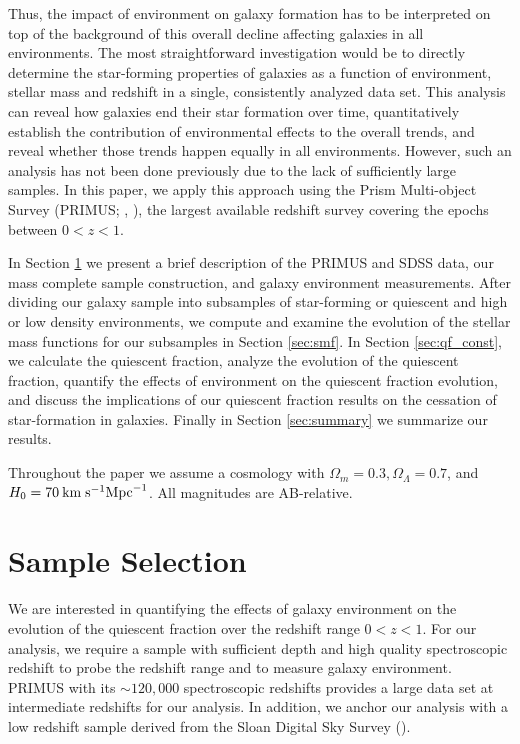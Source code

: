 \documentclass{emulateapj}
\begin{document}
Thus, the impact of environment on galaxy formation has to be
interpreted on top of the background of this overall decline affecting
galaxies in all environments. The most straightforward investigation
would be to directly determine the star-forming properties of galaxies
as a function of environment, stellar mass and redshift in a single,
consistently analyzed data set. This analysis can reveal how galaxies
end their star formation over time, quantitatively establish the
contribution of environmental effects to the overall trends, and
reveal whether those trends happen equally in all environments.
However, such an analysis has not been done previously due to the lack
of sufficiently large samples. In this paper, we apply this approach
using the Prism Multi-object Survey (PRIMUS; \citealt{Coil:2011aa},
\citealt{Cool:2013aa}), the largest available redshift survey covering
the epochs between $0<z<1$.

In Section \ref{sec:sample} we present a brief description of the
PRIMUS and SDSS data, our mass complete sample construction, and
galaxy environment measurements. After dividing our galaxy sample into
subsamples of star-forming or quiescent and high or low density
environments, we compute and examine the evolution of the stellar mass
functions for our subsamples in Section \ref{sec:smf}. In
Section \ref{sec:qf_const}, we calculate the quiescent fraction,
analyze the evolution of the quiescent fraction, quantify the effects
of environment on the quiescent fraction evolution, and discuss the
implications of our quiescent fraction results on the cessation of
star-formation in galaxies. Finally in Section \ref{sec:summary} we
summarize our results.

Throughout the paper we assume a cosmology with $\Omega_{m} = 0.3,
\Omega_{\Lambda} = 0.7$, and $H_0 = 70 \: \rm{km} \; \rm{s}^{-1}
\rm{Mpc}^{-1}$. All magnitudes are AB-relative. 

\section{Sample Selection} \label{sec:sample}
We are interested in quantifying the effects of galaxy environment on
the evolution of the quiescent fraction over the redshift range $0 < z < 1$. For our analysis, we require a sample with sufficient depth and high quality spectroscopic redshift to probe the redshift range and to measure galaxy environment. PRIMUS with its $\sim 120,000$ spectroscopic redshifts provides a large data set at intermediate redshifts for our analysis. In addition, we anchor our analysis with a low redshift sample derived from the Sloan Digital Sky Survey (\cite{York:2000aa}). 
\end{document}
